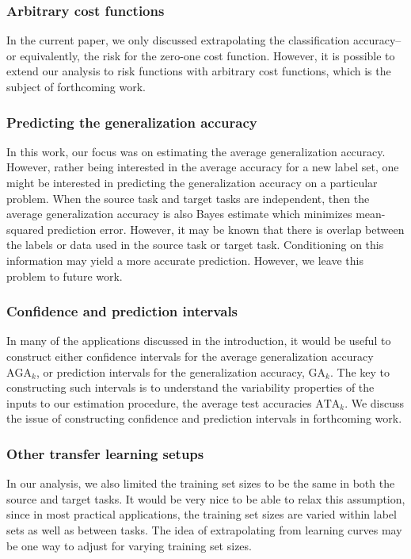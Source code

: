 \documentclass[twoside,11pt]{article}
\begin{document}
\subsubsection*{Arbitrary cost functions}

In the current paper, we only discussed extrapolating the
classification accuracy--or equivalently, the risk for the zero-one
cost function.  However, it is possible to extend our analysis to risk
functions with arbitrary cost functions, which is the subject of
forthcoming work.

\subsubsection*{Predicting the generalization accuracy}
In this work, our focus was on estimating the average generalization accuracy.  However, rather being interested in the average accuracy for a new label set, one might be interested in predicting the generalization accuracy on a particular problem.  When the source task and target tasks are independent, then the average generalization accuracy is also Bayes estimate which minimizes mean-squared prediction error.  However, it may be known that there is overlap between the labels or data used in the source task or target task.  Conditioning on this information may yield a more accurate prediction.  However, we leave this problem to future work.

\subsubsection*{Confidence and prediction intervals}
In many of the applications discussed in the introduction, it would be useful to construct either confidence intervals for the average generalization accuracy $\text{AGA}_k$, or prediction intervals for the generalization accuracy, $\text{GA}_k$.
The key to constructing such intervals is to understand the variability properties of the inputs to our estimation procedure, the average test accuracies $\text{ATA}_k$.  We discuss the issue of constructing confidence and prediction intervals in forthcoming work.

\subsubsection*{Other transfer learning setups}
In our analysis, we also limited the training set sizes to be the same in both the source and target tasks.  It would be very nice to be able to relax this assumption, since in most practical applications, the training set sizes are varied within label sets as well as between tasks.  The idea of extrapolating from learning curves \citep{cortes1994learning} may be one way to adjust for varying training set sizes.  
\end{document}
